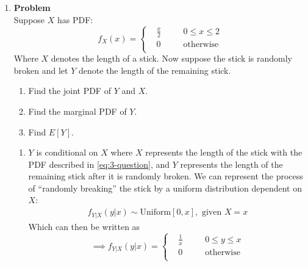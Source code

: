 \documentclass[12pt]{article}
\newenvironment{Ex}{\textbf{Problem}\vspace{.75em}\\}{}
\begin{document}
\begin{enumerate}
\begin{Ex}
  \end{Ex}
\item
  \begin{Ex}
    Suppose $X$ has PDF:
    \begin{equation}
      \label{eq:3-question}
      f_X(x) = \left\{
        \begin{aligned}
          &\frac{x}{2} &&\quad 0\le x\le 2 \\
          &0 &&\quad \text{otherwise} \\
        \end{aligned}\right.
    \end{equation}
    Where $X$ denotes the length of a stick. Now suppose the stick is
    randomly broken and let $Y$ denote the length of the remaining
    stick.
    \begin{enumerate}
    \item Find the joint PDF of $Y$ and $X$.
    \item Find the marginal PDF of $Y$.
    \item Find $E[Y]$.
    \end{enumerate}
    \begin{solution} \hfill
      \begin{enumerate}
      \item $Y$ is conditional on $X$ where $X$ represents the length
        of the stick with the PDF described in \cref{eq:3-question},
        and $Y$ represents the length of the remaining stick after it
        is randomly broken. We can represent the process of ``randomly
        breaking'' the stick by a uniform distribution dependent on
        $X$:
        \begin{equation}
          \label{eq:3a-y-given-x-dist}
          \begin{aligned}
            f_{Y|X}(y|x) \sim \text{Uniform}[0,x], \text{ given } X = x
          \end{aligned}
        \end{equation}
        Which can then be written as
        \begin{equation}
          \label{eq:3a-y-given-x-pdf}
          \implies f_{Y|X}(y|x) = \left\{
            \begin{aligned}
              & \frac{1}{x} &&\quad 0 \le y \le x \\
              & 0 &&\quad \text{otherwise} \\
            \end{aligned} \right.
        \end{equation}

\end{enumerate}
\end{solution}
\end{Ex}
\end{enumerate}
\end{document}
